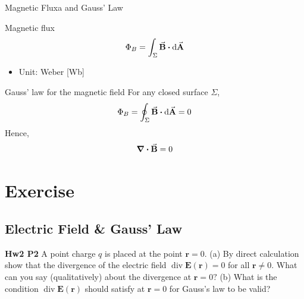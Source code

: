 \documentclass{beamer}
\begin{document}
\begin{frame}{Magnetic Fluxa and Gauss' Law}
    \begin{block}{Magnetic flux}
        \begin{equation}
            \Phi_B = \int_\Sigma \va{B} \vdot \dd{\va{A}}
        \end{equation}
    \end{block}
    \begin{itemize}
        \item Unit: Weber [Wb]
    \end{itemize}
    \vfill
    \begin{block}{Gauss' law for the magnetic field}
        For any closed surface $\Sigma$,
        \begin{equation}
            \Phi_B = \oint_\Sigma \va{B} \vdot \dd{\va{A}} = 0
        \end{equation}
        Hence,
        \begin{equation}
            \div{\va{B}} = 0
        \end{equation}
    \end{block}
\end{frame}




\section{Exercise}

\subsection{\bf Electric Field \& Gauss' Law}

\begin{frame}{\bf Hw2 P2}
A point charge $q$ is placed at the point $\mathbf{r}=0$.
(a) By direct calculation show that the divergence of the 
electric field $\operatorname{div} \mathbf{E}(\mathbf{r})=0$ 
for all $\mathbf{r} \neq 0 .$ What can you say (qualitatively) 
about the divergence at $\mathbf{r}=0 ?$
(b) What is the condition $\operatorname{div} \mathbf{E}(\mathbf{r})$ 
should satisfy at $\mathbf{r}=0$ for Gauss's law to be valid? 
\end{frame}
\end{document}
